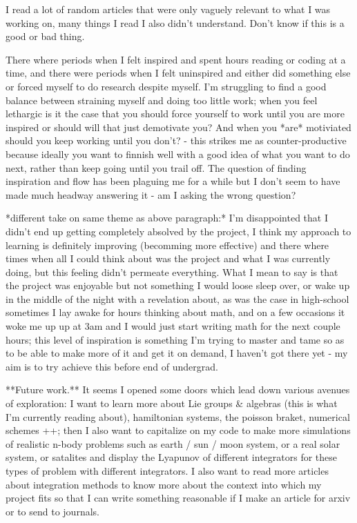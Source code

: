 \documentclass[12pt]{article}
\begin{document}
I read a lot of random articles that were only vaguely relevant to what I was working on, many things I read I also didn't understand. Don't know if this is a good or bad thing.

There where periods when I felt inspired and spent hours reading or coding at a time, and there were periods when I felt uninspired and either did something else or forced myself to do research despite myself. I'm struggling to find a good balance between straining myself and doing too little work; when you feel lethargic is it the case that you should force yourself to work until you are more inspired or should will that just demotivate you? And when you *are* motiviated should you keep working until you don't? - this strikes me as counter-productive because ideally you want to finnish well with a good idea of what you want to do next, rather than keep going until you trail off. The question of finding inspiration and flow has been plaguing me for a while but I don't seem to have made much headway answering it - am I asking the wrong question?

*different take on same theme as above paragraph:* 
I'm disappointed that I didn't end up getting completely absolved by the project, I think my approach to learning is definitely improving (becomming more effective) and there where times when all I could think about was the project and what I was currently doing, but this feeling didn't permeate everything. What I mean to say is that the project was enjoyable but not something I would loose sleep over, or wake up in the middle of the night with a revelation about, as was the case in high-school sometimes I lay awake for hours thinking about math, and on a few occasions it woke me up up at 3am and I would just start writing math for the next couple hours; this level of inspiration is something I'm trying to master and tame so as to be able to make more of it and get it on demand, I haven't got there yet - my aim is to try achieve this before end of undergrad. 

**Future work.**
It seems I opened some doors which lead down various avenues of exploration: I want to learn more about Lie groups \& algebras (this is what I'm currently reading about), hamiltonian systems, the poisson braket, numerical schemes ++; then I also want to capitalize on my code to make more simulations of realistic n-body problems such as earth / sun / moon system, or a real solar system, or satalites and display the Lyapunov of different integrators for these types of problem with different integrators. I also want to read more articles about integration methods to know more about the context into which my project fits so that I can write something reasonable if I make an article for arxiv or to send to journals.
\end{document}

